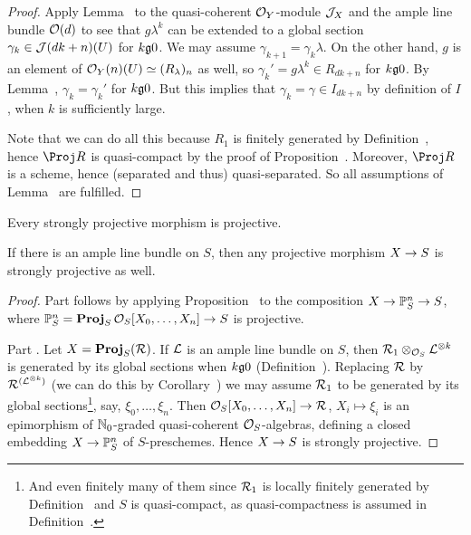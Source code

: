 \documentclass[a4paper,parskip=half,numbers=enddot, DIV=12]{scrreprt}
\begin{document}
\begin{proof}
	Apply Lemma~ to the quasi-coherent $\mathcal{O}_Y$-module $\mathcal{J}_X$ and the ample line bundle $\mathcal{O}(d)$ to see that $g\lambda^k$ can be extended to a global section $\gamma_k\in\mathcal{J}(dk+n)(U)$ for $k\gge 0$. We may assume $\gamma_{k+1}=\gamma_k\lambda$. On the other hand, $g$ is an element of $\mathcal{O}_Y(n)(U)\simeq (R_\lambda)_n$ as well, so $\gamma_k'=g\lambda^k\in R_{dk+n}$ for $k\gge 0$. By Lemma~, $\gamma_k=\gamma_k'$ for $k\gge 0$. But this implies that $\gamma_k=\gamma\in I_{dk+n}$ by definition of $I$, when $k$ is sufficiently large.
	
	Note that we can do all this because $R_1$ is finitely generated by Definition~, hence $\Proj R$ is quasi-compact by the proof of Proposition~. Moreover, $\Proj R$ is a scheme, hence (separated and thus) quasi-separated. So all assumptions of Lemma~ are fulfilled.
\end{proof}
\begin{cor}
	\begin{alphanumerate}
		\item {}Every strongly projective morphism is projective.
		\item If there is an ample line bundle on $S$, then any projective morphism $X\morphism S$ is strongly projective as well.
	\end{alphanumerate}
\end{cor}
\begin{proof}
	Part  follows by applying Proposition~ to the composition $X\morphism\IP_S^n\morphism S$, where $\IP_S^n=\PROJ_S\Oo_S[X_0,\ldots,X_n]\morphism S$ is projective.
	
	Part . Let $X=\operatorname{\mathbf{Proj}}_S(\mathcal{R})$. If $\mathcal{L}$ is an ample line bundle on $S$, then $\mathcal{R}_1\otimes_{\mathcal{O}_S}\mathcal{L}^{\otimes k}$ is generated by its global sections when $k\gge 0$ (Definition~). Replacing $\mathcal{R}$ by $\mathcal{R}^{(\mathcal{L}^{\otimes k})}$ (we can do this by Corollary~) we may assume $\mathcal{R}_1$ to be generated by its global sections\footnote{And even finitely many of them since $\mathcal{R}_1$ is locally finitely generated by Definition~ and $S$ is quasi-compact, as quasi-compactness is assumed in Definition~.}, say, $\xi_0,\ldots,\xi_n$. Then $\Oo_S[X_0,\ldots,X_n]\morphism\Rr$, $X_i\mapsto \xi_i$ is an epimorphism of $\mathbb{N}_0$-graded quasi-coherent $\mathcal{O}_S$-algebras, defining a closed embedding $X\morphism\IP_S^n$ of $S$-preschemes. Hence $X\morphism S$ is strongly projective.
\end{proof}
\end{document}
